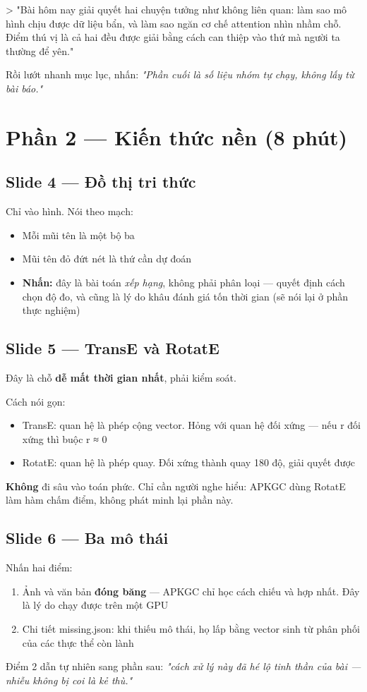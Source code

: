 \documentclass[11pt,a4paper]{article}
\newcommand{\code}[1]{{\ttfamily\small\color{codetext}#1}}
\begin{document}
> "Bài hôm nay giải quyết hai chuyện tưởng như không liên quan: làm sao mô hình chịu được dữ liệu bẩn, và làm sao ngăn cơ chế attention nhìn nhầm chỗ. Điểm thú vị là cả hai đều được giải bằng cách can thiệp vào thứ mà người ta thường để yên."

Rồi lướt nhanh mục lục, nhấn: \emph{"Phần cuối là số liệu nhóm tự chạy, không lấy từ bài báo."}

\section{Phần 2 --- Kiến thức nền (8 phút)}
\subsection{Slide 4 --- Đồ thị tri thức}
Chỉ vào hình. Nói theo mạch:

\begin{itemize}\itemsep2pt
\item Mỗi mũi tên là một bộ ba
\item Mũi tên đỏ đứt nét là thứ cần dự đoán
\item \textbf{Nhấn:} đây là bài toán \emph{xếp hạng}, không phải phân loại --- quyết định cách chọn độ đo, và cũng là lý do khâu đánh giá tốn thời gian (sẽ nói lại ở phần thực nghiệm)
\end{itemize}
\subsection{Slide 5 --- TransE và RotatE}
Đây là chỗ \textbf{dễ mất thời gian nhất}, phải kiểm soát.

Cách nói gọn:

\begin{itemize}\itemsep2pt
\item TransE: quan hệ là phép cộng vector. Hỏng với quan hệ đối xứng --- nếu \code{r} đối xứng thì buộc \code{r ≈ 0}
\item RotatE: quan hệ là phép quay. Đối xứng thành quay 180 độ, giải quyết được
\end{itemize}
\textbf{Không} đi sâu vào toán phức. Chỉ cần người nghe hiểu: APKGC dùng RotatE làm hàm chấm điểm, không phát minh lại phần này.

\subsection{Slide 6 --- Ba mô thái}
Nhấn hai điểm:

\begin{enumerate}\itemsep2pt
\item Ảnh và văn bản \textbf{đóng băng} --- APKGC chỉ học cách chiếu và hợp nhất. Đây là lý do chạy được trên một GPU
\item Chi tiết \code{missing.json}: khi thiếu mô thái, họ lấp bằng vector sinh từ phân phối của các thực thể còn lành
\end{enumerate}
Điểm 2 dẫn tự nhiên sang phần sau: \emph{"cách xử lý này đã hé lộ tinh thần của bài --- nhiễu không bị coi là kẻ thù."}
\end{document}
